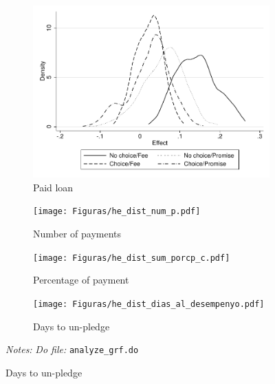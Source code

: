 \documentclass[11pt]{article}
\begin{document}
\begin{figure}[H]
    \caption{Heterogeneous Treatment Effect}
    \label{Treatment Effect}
    \begin{center}
    \begin{subfigure}{0.4\textwidth}
        \caption{Paid loan}
        \centering
        \includegraphics[width=\textwidth]{Figuras/he_dist_des_c.pdf}
    \end{subfigure}
    \begin{subfigure}{0.4\textwidth}
        \caption{Number of payments}
        \centering
        \texttt{[image: Figuras/he\_dist\_num\_p.pdf]}
    \end{subfigure}
     \begin{subfigure}{0.4\textwidth}
      \caption{Percentage of payment}
        \centering
        \texttt{[image: Figuras/he\_dist\_sum\_porcp\_c.pdf]}
    \end{subfigure}
    \begin{subfigure}{0.4\textwidth}
      \caption{Days to un-pledge}
        \centering
        \texttt{[image: Figuras/he\_dist\_dias\_al\_desempenyo.pdf]}
    \end{subfigure}    
    \end{center}
     \footnotesize \textit{Notes: } 
      \footnotesize{ \textit{Do file: }  \texttt{analyze\_grf.do}}
\end{figure}
\end{document}
